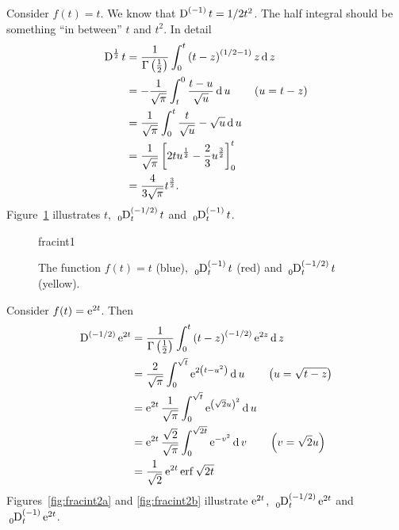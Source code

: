 \begin{example}
  Consider $f(t) = t$. We know that $\tensor*[]{\D}{^{(-1)}}t = 1/2 t^2$. The half integral should be something ``in between'' $t$ and $t^2$. In detail
  \begin{align*}
    \tensor*[]{\D}{^{\frac{1}{2}}} t &= \frac{1}{\Gamma \left( \frac{1}{2} \right)} \int_0^t \left( t - z \right)^{\left( 1/2 - 1 \right)} z \d z \\
    &= -\frac{1}{\sqrt{\pi}} \int_t^0 \frac{t - u}{\sqrt{u}} \d u \qquad \left(u = t - z \right)\\
    &= \frac{1}{\sqrt{\pi}} \int_0^t \frac{t}{\sqrt{u}} - \sqrt{u} \d u \\
    &= \frac{1}{\sqrt{\pi}} \left[ 2 t u^\frac{1}{2} - \frac{2}{3} u^\frac{3}{2} \right]_0^t \\
    &= \frac{4}{3 \sqrt{\pi}} t^\frac{3}{2}.
    \label{ex:fracint1}
  \end{align*}
  Figure~\ref{fig:fracint1} illustrates $t$, $\tensor*[_0]{\D}{^{\left( -1/2 \right)}_t} t$ and $\tensor*[_0]{\D}{^{(-1)}_t} t$.
\end{example}

\begin{figure}
  \centering
  {fracint1}
  \caption{The function $f(t) = t$ (blue), $\tensor*[_0]{\D}{^{(-1)}_t}t$ (red) and $\tensor*[_0]{\D}{^{(-1/2)}_t} t$ (yellow).}
  \label{fig:fracint1}
\end{figure}

\begin{example}
  Consider $f(t) = \operatorname{e}^{ 2 t }$. Then
  \begin{align*}
    \tensor*[]{\D}{^{\left(-1/2\right)}} \e^{2 t} &= \frac{1}{\Gamma \left( \frac{1}{2} \right)} \int_0^t \left( t - z \right)^{(-1/2)} \e^{2 z} \d z \\
    &= \frac{2}{\sqrt{\pi}} \int_0^{\sqrt{t}} \e^{ 2 \left( t - u^2 \right) } \d u \qquad \left( u = \sqrt{t - z} \right) \\
    &= \e^{2 t} \frac{1}{\sqrt{\pi}} \int_0^{\sqrt{t}} \e^{\left( \sqrt{2} u \right)^2} \d u \\
    &= \e^{2 t} \frac{\sqrt{2}}{\sqrt{\pi}} \int_0^{\sqrt{2 t}} \e^{-v^2} \d v \qquad \left( v = \sqrt{2} u \right) \\
    &= \frac{1}{\sqrt{2}} \e^{2 t} \erf{\sqrt{2 t}}
  \end{align*}
  Figures~\ref{fig:fracint2a} and \ref{fig:fracint2b} illustrate $\operatorname{e}^{2 t}$, $\tensor*[_0]{\D}{^{\left( -1/2 \right)}_t} \e^{2 t}$ and $\tensor*[_0]{\D}{^{(-1)}_t} \e^{2 t}$.
\end{example}

